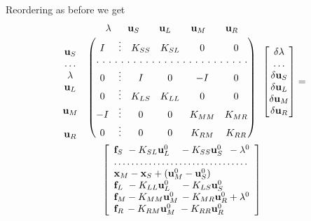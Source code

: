\documentclass[11pt]{article}
\newcommand{\vecx}{{\bf x}}
\newcommand{\vecu}{{\bf u}}
\newcommand{\vecf}{{\bf f}}
\begin{document}
Reordering as before we get
\begin{multline}
\label{eq:J_partial_reordering}
\begin{array}{lc}  &  \begin{array}{ccccc} \lambda \ \  & \vecu_S \quad & \vecu_L \quad & \vecu_M & \quad \vecu_R \end{array}\\
\begin{matrix} \\ \vecu_S  \\ \dots \\ \lambda \\ \vecu_L \\ \\ \vecu_M \\ \\ \vecu_R\end{matrix} &
\begin{pmatrix}
  I &\vdots & K_{SS} & K_{SL} &  0 & 0\\
  \hdotsfor[2]{6}\\
  0 &\vdots & I     &   0     & -I& 0\\
  0 &\vdots& K_{LS} &   K_{LL}&  0 & 0\\
 -I &\vdots & 0     &    0   & K_{MM}& K_{MR}\\
  0 &\vdots & 0     &    0   & K_{RM} & K_{RR}
\end{pmatrix}
\end{array}
\begin{bmatrix}
\delta \lambda\\ \dots \\ \delta \vecu_S \\ \delta \vecu_L \\ \delta \vecu_M \\ \delta \vecu_R
\end{bmatrix}
=\\
\left[\begin{array}{l}
\vecf_S \ - K_{SL} \vecu_L^0 \ \ \ - K_{SS} \vecu_S^0 \ \,- \lambda^0\\
\dots\dots\dots\dots\dots\dots\dots\dots\dots\dots.\\
\vecx_M - \vecx_S + (\vecu_M^0 - \vecu_S^0)\\
\vecf_L \ - K_{LL} \vecu_L^0 \ \ \ - K_{LS} \vecu_S^0 \\
\vecf_M - K_{MM} \vecu_M^0 \, - K_{MR} \vecu_R^0  + \lambda^0\\
\vecf_R \, - K_{RM} \vecu_M^0 \ - K_{RR} \vecu_R^0 \\
\end{array}\right]
\end{multline}
\end{document}
